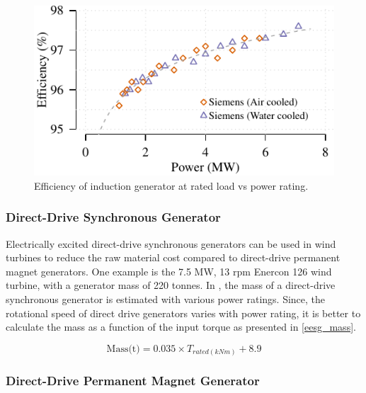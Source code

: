 \documentclass{article}\usepackage{graphicx, color}
\makeatletter
\def\maxwidth{ %
  \ifdim\Gin@nat@width>\linewidth
    \linewidth
  \else
    \Gin@nat@width
  \fi
}
\newenvironment{knitrout}{}{} %
\makeatother
\begin{document}
\begin{knitrout}
\color{fgcolor}\begin{figure}[]

\includegraphics[width=\maxwidth]{figure/induction_generator_efficiency} \caption[Efficiency of induction generator at rated load vs power rating]{Efficiency of induction generator at rated load vs power rating.\label{fig:induction_generator_efficiency}}
\end{figure}


\end{knitrout}



\subsubsection{Direct-Drive Synchronous Generator}

Electrically excited direct-drive synchronous generators can be used in wind turbines to reduce the raw material cost compared to direct-drive permanent magnet generators. One example is the 7.5 MW, 13 rpm Enercon 126 wind turbine, with a generator mass of 220 tonnes.
In \cite{upwind2011}, the mass of a direct-drive synchronous generator is estimated with various power ratings. Since, the rotational speed of direct drive generators varies with power rating, it is better to calculate the mass as a function of the input torque as presented in \autoref{eesg_mass}.

\begin{equation}
  \text{Mass(t)} = 0.035 \times {T_{rated(kNm)}} + 8.9
  \label{eesg_mass}
\end{equation}

\subsubsection{Direct-Drive Permanent Magnet Generator}
\end{document}
